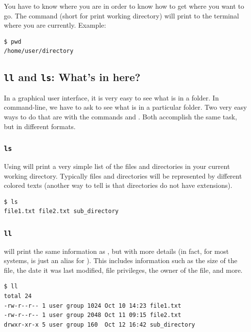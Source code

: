 You have to know where you are in order to know how to get where you want to go. The command  (short for print working directory) will print to the terminal where you are currently. Example:

\begin{lstlisting}
$ pwd
/home/user/directory
\end{lstlisting}

\subsection{\texttt{ll} and \texttt{ls}: What's in here?}

In a graphical user interface, it is very easy to see what is in a folder. In command-line, we have to ask to see what is in a particular folder. Two very easy ways to do that are with the commands  and . Both accomplish the same task, but in different formats.

\subsubsection{\texttt{ls}}

Using  will print a very simple list of the files and directories in your current working directory. Typically files and directories will be represented by different colored texts (another way to tell is that directories do not have extensions).

\begin{lstlisting}
$ ls
file1.txt file2.txt sub_directory
\end{lstlisting}

\subsubsection{\texttt{ll}}

 will print the same information as , but with more details (in fact, for most systems,  is just an alias for ). This includes information such as the size of the file, the date it was last modified, file privileges, the owner of the file, and more.

\begin{lstlisting}
$ ll
total 24
-rw-r--r-- 1 user group 1024 Oct 10 14:23 file1.txt
-rw-r--r-- 1 user group 2048 Oct 11 09:15 file2.txt
drwxr-xr-x 5 user group 160  Oct 12 16:42 sub_directory
\end{lstlisting}

